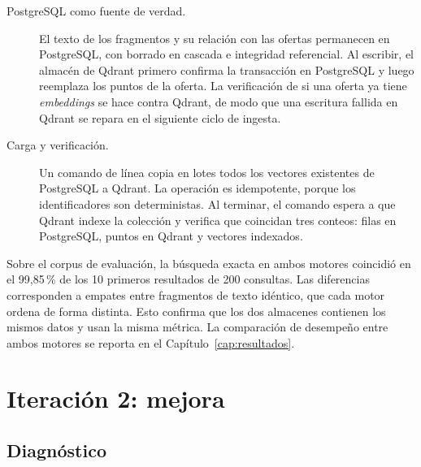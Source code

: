 \begin{description}
    \item[PostgreSQL como fuente de verdad.] El texto de los fragmentos y su relación con las ofertas permanecen en PostgreSQL, con borrado en cascada e integridad referencial. Al escribir, el almacén de Qdrant primero confirma la transacción en PostgreSQL y luego reemplaza los puntos de la oferta. La verificación de si una oferta ya tiene \textit{embeddings} se hace contra Qdrant, de modo que una escritura fallida en Qdrant se repara en el siguiente ciclo de ingesta.
    \item[Carga y verificación.] Un comando de línea copia en lotes todos los vectores existentes de PostgreSQL a Qdrant. La operación es idempotente, porque los identificadores son deterministas. Al terminar, el comando espera a que Qdrant indexe la colección y verifica que coincidan tres conteos: filas en PostgreSQL, puntos en Qdrant y vectores indexados.
\end{description}

Sobre el corpus de evaluación, la búsqueda exacta en ambos motores coincidió en el 99,85\,\% de los 10 primeros resultados de 200 consultas. Las diferencias corresponden a empates entre fragmentos de texto idéntico, que cada motor ordena de forma distinta. Esto confirma que los dos almacenes contienen los mismos datos y usan la misma métrica. La comparación de desempeño entre ambos motores se reporta en el Capítulo~\ref{cap:resultados}.

\section{Iteración 2: mejora}
\label{sec:art-iter-recuperacion}

\subsection{Diagnóstico}

